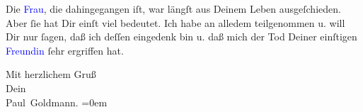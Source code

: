 \pstart
           Die \textcolor{blue}{Frau}{}\ledrightnote{{$\rightarrow$}\textcolor{blue}{Marie Glümer}}, die dahingegangen
               iſt, war längſt aus Deinem Leben ausgeſchieden. Aber ſie hat Dir einſt viel bedeutet.
                   Ich habe an alledem {\pb}teilgenommen u. will Dir nur ſagen, daß ich
               deſſen eingedenk bin u. daß mich der Tod Deiner einſtigen \textcolor{blue}{Freundin}{}\ledrightnote{{$\rightarrow$}\textcolor{blue}{Marie Glümer}} ſehr ergriffen hat.\pend
           
\pstart
           Mit herzlichem Gruß {\\[\baselineskip]}Dein {\\[\baselineskip]}\spacefill\mbox{Paul Goldmann.}\pend
           \leftskip=0em{}\endnumbering{}  
      